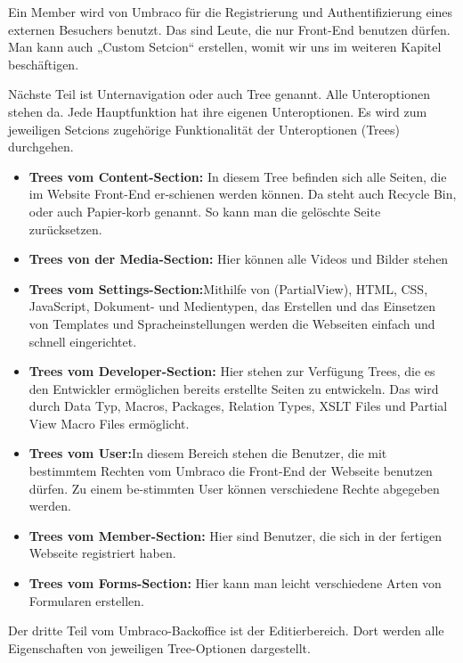 Ein Member wird von Umbraco für die Registrierung und Authentifizierung eines externen Besuchers benutzt. Das sind Leute, die nur Front-End benutzen dürfen. 
Man kann auch „Custom Setcion“ erstellen, womit wir uns im weiteren Kapitel beschäftigen. 

Nächste Teil ist Unternavigation oder auch Tree genannt. Alle Unteroptionen stehen da. Jede Hauptfunktion hat ihre eigenen Unteroptionen.
Es wird zum jeweiligen Setcions zugehörige Funktionalität der Unteroptionen (Trees) durchgehen.

\begin{itemize}	
	\item\textbf{Trees vom Content-Section:} In diesem Tree befinden sich alle Seiten, die im Website Front-End er-schienen werden können. Da steht auch Recycle Bin, oder auch Papier-korb genannt. So kann man die gelöschte Seite zurücksetzen. 
	\item\textbf{Trees von der Media-Section:} Hier können alle Videos und Bilder stehen
	\item\textbf{Trees vom Settings-Section:}Mithilfe von (PartialView), HTML, CSS, JavaScript, Dokument- und Medientypen, das Erstellen und das Einsetzen von Templates und Spracheinstellungen werden die Webseiten einfach und schnell eingerichtet.
	\item\textbf{Trees vom Developer-Section:} Hier stehen zur Verfügung Trees, die es den Entwickler ermöglichen bereits erstellte Seiten zu entwickeln. Das wird durch Data Typ, Macros, Packages, Relation Types, XSLT Files und Partial View Macro Files ermöglicht.
	\item\textbf{Trees vom User:}In diesem Bereich stehen die Benutzer, die mit bestimmtem Rechten vom Umbraco die Front-End der Webseite benutzen dürfen. Zu einem be-stimmten User können verschiedene Rechte abgegeben werden. 
	\item\textbf{Trees vom Member-Section:} Hier sind Benutzer, die sich in der fertigen Webseite registriert haben.
	\item\textbf{Trees vom Forms-Section: } Hier kann man leicht verschiedene Arten von Formularen erstellen.		
\end{itemize}

Der dritte Teil vom Umbraco-Backoffice ist der Editierbereich. Dort werden alle Eigenschaften von jeweiligen Tree-Optionen dargestellt.


